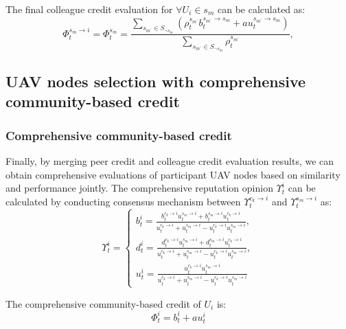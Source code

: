 \documentclass[lettersize,journal]{IEEEtran}
\begin{document}
The final colleague credit evaluation for $\forall U_i \in s_m$ can be calculated as:
\begin{equation}
\Phi^{s_m \rightarrow i}_{t}=\Phi^{s_m}_{t}=\frac{\sum_{s_{m^{\prime}}\in S_{\neg s_m}}{(\rho^{s_{m^{\prime}}}_{t} b^{s_{m^{\prime}} \rightarrow s_{m}}_{t}+ a u^{s_{m^{\prime}} \rightarrow s_{m}}_{t})}}{\sum_{s_{m^{\prime}}\in S_{\neg s_m}}{\rho^{s_{m^{\prime}}}_{t}}},   
\end{equation}



\subsection{UAV nodes selection with comprehensive
community-based credit}
\subsubsection{Comprehensive community-based credit} 
Finally, by merging peer credit and colleague credit evaluation results, we can obtain comprehensive evaluations of participant UAV nodes based on similarity and performance jointly. 
The comprehensive reputation opinion $\Upsilon^{i}_{t}$ can be calculated by conducting consensus mechanism between $\Upsilon^{c_k\rightarrow i}_{t}$ and $\Upsilon^{s_m\rightarrow i}_{t}$ as:
\begin{equation}
\Upsilon^{i}_{t}=
\left  \{
      \begin{array}{ll}%
        b^{i}_{t}=\frac{b^{c_k \rightarrow i}_{t}u^{s_m \rightarrow i}_{t}+b^{s_m \rightarrow i}_{t}u^{c_k \rightarrow i}_{t}}
        {u^{c_k \rightarrow i}_{t}+u^{s_m \rightarrow i}_{t}-u^{c_k \rightarrow i}_{t}u^{s_m \rightarrow i}_{t}},\\
        d^{i}_{t}=\frac{d^{c_k \rightarrow i}_{t}u^{s_m \rightarrow i}_{t}+d^{s_m \rightarrow i}_{t}u^{c_k \rightarrow i}_{t}}
        {u^{c_k \rightarrow i}_{t}+u^{s_m \rightarrow i}_{t}-u^{c_k \rightarrow i}_{t}u^{s_m \rightarrow i}_{t}},\\
        u^{i}_{t}=\frac{u^{c_k \rightarrow i}_{t}u^{s_m \rightarrow i}_{t}}
        {u^{c_k \rightarrow i}_{t}+u^{s_m \rightarrow i}_{t}-u^{c_k \rightarrow i}_{t}u^{s_m \rightarrow i}_{t}}         
    \end{array}
\right.
\end{equation}

The comprehensive community-based credit of $U_i$ is: 
\begin{equation}
\Phi^{i}_{t}=b^{i}_{t}+a u^{i}_{t}
\end{equation}
\end{document}
